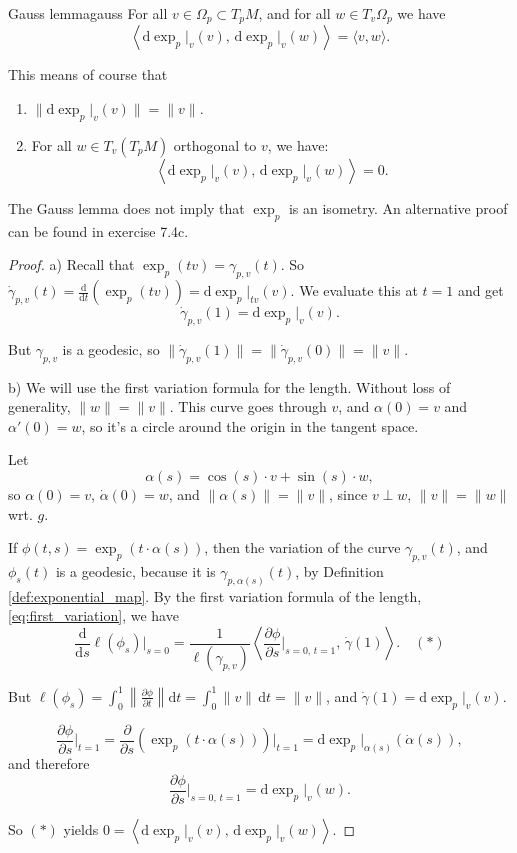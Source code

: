 \begin{colorlem}{Gauss lemma}{gauss}
For all $v \in \Omega_p\subset T_pM$, and for all $w \in T_v \Omega_p$ we have
\[
\left\langle \mathrm{d} \exp_p\big|_v (v),\, \mathrm{d} \exp_p\big|_v (w) \right\rangle = \langle v, w \rangle.
\]
\end{colorlem}

This means of course that 
\begin{enumerate}
\item[a)] $\| \mathrm{d} \exp_p\big|_v (v) \| = \|v\|$.
\item[b)] For all $w \in T_v(T_p M)$ orthogonal to $v$, we have:
\[
\left\langle \mathrm{d} \exp_p\big|_v (v),\, \mathrm{d} \exp_p\big|_v (w) \right\rangle = 0.
\]
\end{enumerate}

The Gauss lemma does not imply that $\exp_p$ is an isometry. An alternative proof can be found in exercise 7.4c.

\begin{proof}
a) Recall that $\exp_p(tv) = \gamma_{p,v}(t)$. So $\dot{\gamma}_{p,v}(t) = \frac{\mathrm{d}}{\mathrm{d} t}(\exp_p(tv)) = \mathrm{d} \exp_p\big|_{tv}(v)$. We evaluate this at $t=1$ and get
$$\dot{\gamma}_{p,v}(1) = \mathrm{d} \exp_p\big|_v (v).$$

But $\gamma_{p,v}$ is a geodesic, so $\|\dot{\gamma}_{p,v}(1)\| = \|\dot{\gamma}_{p,v}(0)\| = \|v\|$.


b) We will use the first variation formula for the length. Without loss of generality, $\|w\| = \|v\|$. This curve goes through $v$, and $\alpha(0)=v$ and $\alpha'(0)=w$, so it's a circle around the origin in the tangent space.

Let 
$$\alpha(s) = \cos(s) \cdot v + \sin(s) \cdot w,$$ 
so $\alpha(0) = v$, $\dot{\alpha}(0) = w$, and $\|\alpha(s)\| = \|v\|$, since $v \perp w$, $\|v\| = \|w\|$ wrt. $g$.

If $\phi(t, s) = \exp_p(t \cdot \alpha(s))$, then the variation of the curve $\gamma_{p,v}(t)$, and $\phi_s(t)$ is a geodesic, because it is $\gamma_{p,\alpha(s)}(t)$, by Definition \ref{def:exponential_map}. By the first variation formula of the length, \eqref{eq:first_variation}, we have
\[
\frac{\mathrm{d}}{\mathrm{d} s} \ell(\phi_s)\bigg|_{s=0} = \frac{1}{\ell(\gamma_{p,v})} \left\langle \frac{\partial \phi}{\partial s}\bigg|_{s=0,\, t=1},\, \dot{\gamma}(1) \right\rangle. \quad (*)
\]

But $\ell(\phi_s) = \int_0^1 \left\| \frac{\partial \phi}{\partial t} \right\| \mathrm{d} t = \int_0^1 \|v\| \, \mathrm{d} t = \|v\|$, and $\dot{\gamma}(1) = \mathrm{d} \exp_p\big|_v (v)$.

\[
\frac{\partial \phi}{\partial s}\bigg|_{t=1} = \frac{\partial}{\partial s}(\exp_p(t \cdot \alpha(s)))\bigg|_{t=1} = \mathrm{d} \exp_p\big|_{\alpha(s)}(\dot{\alpha}(s)),
\]
and therefore
\[
\frac{\partial \phi}{\partial s}\bigg|_{s=0,\, t=1} = \mathrm{d} \exp_p\big|_v (w).
\]

So $(*)$ yields $0 = \left\langle \mathrm{d} \exp_p\big|_v (v),\, \mathrm{d} \exp_p\big|_v (w) \right\rangle$.
\end{proof}

